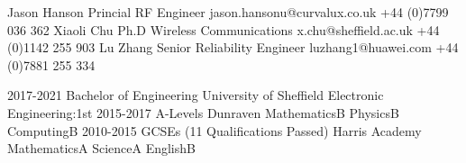 \documentclass[9pt]{developercv} %
\begin{document}
	\begin{minipage}[t]{0.40\textwidth}%

		\halfentry
			{Jason Hanson}
			{Princial RF Engineer}
			{
				\hspace*{0.5cm}jason.hansonu@curvalux.co.uk\newline
				\hspace*{0.5cm}+44 (0)7799 036 362\newline
			}
		\halfentry
			{Xiaoli Chu}
			{Ph.D Wireless Communications}
			{
				\hspace*{0.5cm}x.chu@sheffield.ac.uk\newline
				\hspace*{0.5cm}+44 (0)1142 255 903\newline\newline
			}
		\halfentry
			{Lu Zhang}
			{Senior Reliability Engineer}
			{	
				\hspace*{0.5cm}luzhang1@huawei.com\newline
				\hspace*{0.5cm}+44 (0)7881 255 334\newline
			}

		
	\end{minipage}
	\hspace*{0.5cm}
	\begin{minipage}[t]{0.57\textwidth}

		\halfentrydate
			{2017-2021}
			{Bachelor of Engineering}
			{University of Sheffield}
			{
				\hspace*{0.5cm}Electronic Engineering:\hfill1st\newline\newline
			}
		\halfentrydate
			{2015-2017}
			{A-Levels}
			{Dunraven}
			{
				\hspace*{0.5cm}Mathematics\hfill B\newline
				\hspace*{0.5cm}Physics\hfill B\newline
				\hspace*{0.5cm}Computing\hfill B\newline
			}
		\halfentrydate
			{2010-2015}
			{GCSEs (11 Qualifications Passed)}
			{Harris Academy}
			{
				\hspace*{0.5cm}Mathematics\hfill A\newline
				\hspace*{0.5cm}Science\hfill A\newline
				\hspace*{0.5cm}English\hfill B\newline
			}
	\end{minipage}%

	
\end{document}
